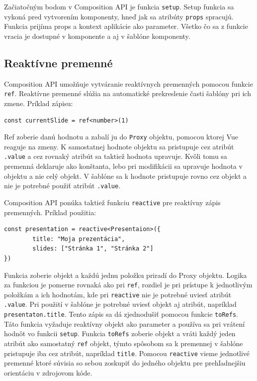 Začiatočným bodom v Composition API je funkcia \texttt{setup}. Setup funkcia sa vykoná pred vytvorením komponenty, hneď jak sa atribúty \texttt{props} spracujú. Funkcia prijíma props a kontext aplikácie ako parameter. Všetko čo sa z funkcie vracia je dostupné v komponente a aj v šablóne komponenty. 

\subsection*{Reaktívne premenné}
Composition API umožňuje vytváranie reaktívnych premenných pomocou funkcie \texttt{ref}. Reaktívne premenné slúžia na automatické prekreslenie časti šablóny pri ich zmene. Príklad zápisu: 
    \begin{verbatim}const currentSlide = ref<number>(1)\end{verbatim}
Ref zoberie danú hodnotu a zabalí ju do \texttt{Proxy} objektu, pomocou ktorej Vue reaguje na zmeny. K samostatnej hodnote objektu sa pristupuje cez atribút \texttt{.value} a cez rovnaký atribút sa taktiež hodnota upravuje. Kvôli tomu sa premenná deklaruje ako konštanta, lebo pri modifikácii sa upravuje hodnota v objektu a nie celý objekt. V šablóne sa k hodnote pristupuje rovno cez objekt a nie je potrebné použiť atribút \texttt{.value}. 

Composition API ponúka taktiež funkciu \texttt{reactive} pre reaktívny zápis premenných. Príklad použitia:
    \begin{verbatim}const presentation = reactive<Presentaion>({
        title: "Moja prezentácia",
        slides: ["Stránka 1", "Stránka 2"]
}) \end{verbatim}
Funkcia zoberie objekt a každú jednu položku priradí do Proxy objektu. Logika za funkciou je pomerne rovnaká ako pri \texttt{ref}, rozdiel je pri prístupe k jednotlivým položkám a ich hodnotám, kde pri \texttt{reactive} nie je potrebné uviesť atribút \texttt{.value}. Pri použití v šablóne je potrebné uviesť objekt aj atribút, napríklad \texttt{presentaton.title}. Tento zápis sa dá zjednodušiť pomocou funkcie \texttt{toRefs}. Táto funkcia vyžaduje reaktívny objekt ako parameter a používa sa pri vrátení hodnôt vo funkcii \texttt{setup}. Funkcia \texttt{toRefs} zoberie objekt a vráti každý jeden atribút ako samostatný \texttt{ref} objekt, týmto spôsobom sa k premennej v šablóne pristupuje iba cez atribút, napríklad \texttt{title}. Pomocou \texttt{reactive} vieme jednotlivé premenné ktoré súvisia so sebou zoskupiť do jedného objektu pre prehľadnejšiu orientáciu v zdrojovom kóde. 

